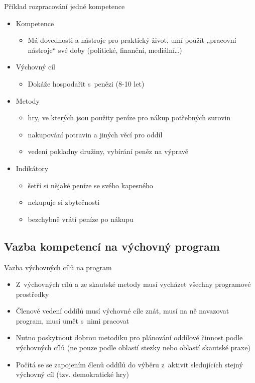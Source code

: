 \documentclass[compress,xelatex,xcolor=dvipsnames,hyperref={pdfpagelabels=false},print]{beamer}
\begin{document}
\begin{frame}{Příklad rozpracování jedné kompetence}
\begin{itemize}
\item Kompetence
 \begin{itemize}
 \item Má dovednosti a nástroje pro praktický život, umí použít „pracovní nástroje“ své doby (politické, finanční, mediální\ldots)
 \end{itemize}
\item Výchovný cíl
 \begin{itemize}
 \item Dokáže hospodařit s penězi (8-10 let)
 \end{itemize}
\item Metody
 \begin{itemize}
 \item hry, ve kterých jsou použity peníze pro nákup potřebných surovin
 \item nakupování potravin a jiných věcí pro oddíl
 \item vedení pokladny družiny, vybírání peněz na výpravě
 \end{itemize}
\item Indikátory
\begin{itemize}
 \item šetří si nějaké peníze se svého kapesného
 \item nekupuje si zbytečnosti
 \item bezchybně vrátí peníze po nákupu
\end{itemize}
\end{itemize}
\end{frame}

\subsection{Vazba kompetencí na výchovný program}

\begin{frame}{Vazba výchovných cílů na program}
\begin{itemize}
\item Z~výchovných cílů a ze skautské metody musí vycházet všechny programové prostředky
\item Členové vedení oddílů musí výchovné cíle znát, musí na ně navazovat program, musí umět s~nimi pracovat
\item Nutno poskytnout dobrou metodiku pro plánování oddílové činnost podle výchovných cílů (ne pouze podle oblastí stezky nebo oblastí skautské praxe)
\item Počítá se se zapojením členů oddílů do výběru z~aktivit sledujících stejný výchovný cíl (tzv. demokratické hry)
\end{itemize}
\end{frame}
\end{document}
